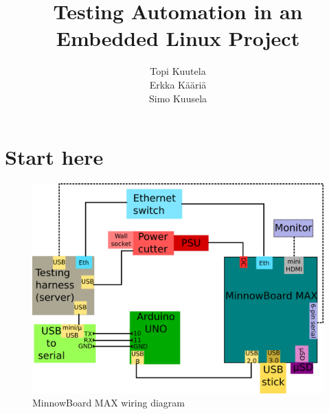 \documentclass[a4paper,11pt]{article}
\begin{document}


\title{Testing Automation in an Embedded Linux Project}
\author{
	Topi Kuutela\\
	Erkka Kääriä\\
	Simo Kuusela
}
\maketitle

\pagebreak

\tableofcontents

\pagebreak

\section{Start here}

\begin{figure}[h]
	\centering
	\includegraphics[width=0.7\linewidth]{minnowwiring.png}
	\caption{MinnowBoard MAX wiring diagram}
\end{figure}
\end{document}
